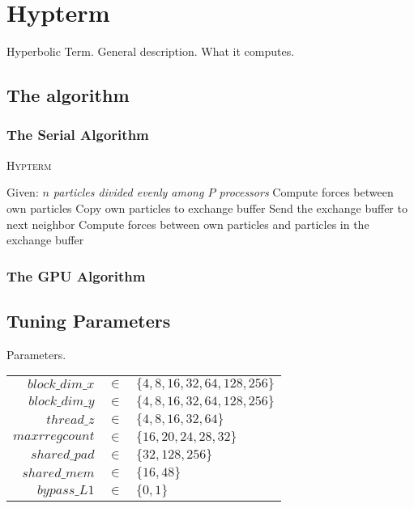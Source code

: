 \section{Hypterm}

Hyperbolic Term. General description. What it computes.

\subsection{The algorithm}
\subsubsection{The Serial Algorithm}
\begin{algorithm}
\caption{\textsc{Hypterm}}
\label{alg:naive_allpairs}
\begin{algorithmic}[1]
\State Given: \emph{ $n$ particles divided evenly among $P$ processors}
\State Compute forces between own particles
\State Copy own particles to exchange buffer
	\State Send the exchange buffer to next neighbor
	\State Compute forces between own particles and particles in the exchange buffer
\EndFor
\end{algorithmic}
\end{algorithm}
\subsubsection{The GPU Algorithm}

\subsection{Tuning Parameters}
Parameters.

\begin{tabular}{r c l}
$block\_dim\_x$ & $\in$ & $\{4, 8, 16, 32, 64, 128,256\}$	\\
$block\_dim\_y$ & $\in$ & $\{4, 8, 16, 32, 64, 128,256\}$	\\
$thread\_z$     & $\in$ & $\{4, 8, 16, 32, 64\}$			\\
$maxrregcount$  & $\in$ & $\{16, 20, 24, 28, 32\}$			\\
$shared\_pad$   & $\in$ & $\{32, 128, 256\}$				\\
$shared\_mem$   & $\in$ & $\{16, 48\}$						\\
$bypass\_L1$    & $\in$ & $\{0, 1\}$						\\
\end{tabular}

